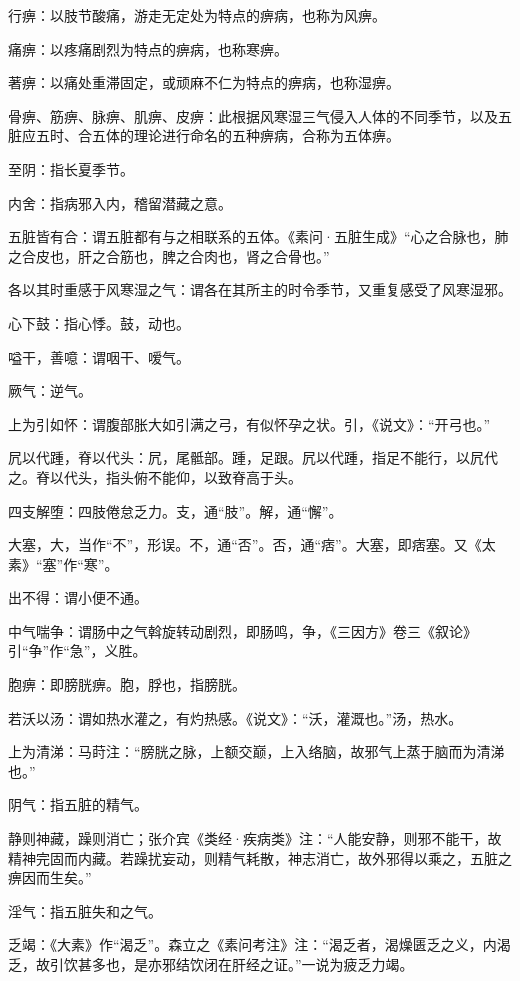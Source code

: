 \documentclass[draft,12pt]{ctexbook}
\begin{document}
\begin{jiaozhu}
	\item 行痹：以肢节酸痛，游走无定处为特点的痹病，也称为风痹。
	\item 痛痹：以疼痛剧烈为特点的痹病，也称寒痹。
	\item 著痹：以痛处重滞固定，或顽麻不仁为特点的痹病，也称湿痹。
	\item 骨痹、筋痹、脉痹、肌痹、皮痹：此根据风寒湿三气侵入人体的不同季节，以及五脏应五时、合五体的理论进行命名的五种痹病，合称为五体痹。
	\item 至阴：指长夏季节。
	\item 内舍：指病邪入内，稽留潜藏之意。
	\item 五脏皆有合：谓五脏都有与之相联系的五体。《素问·五脏生成》“心之合脉也，肺之合皮也，肝之合筋也，脾之合肉也，肾之合骨也。”
	\item 各以其时重感于风寒湿之气：谓各在其所主的时令季节，又重复感受了风寒湿邪。
	\item 心下鼓：指心悸。鼓，动也。
	\item 嗌干，善噫：谓咽干、嗳气。
	\item 厥气：逆气。
	\item 上为引如怀：谓腹部胀大如引满之弓，有似怀孕之状。引，《说文》：“开弓也。”
	\item 凥以代踵，脊以代头：凥，尾骶部。踵，足跟。凥以代踵，指足不能行，以凥代之。脊以代头，指头俯不能仰，以致脊高于头。
	\item 四支解堕：四肢倦怠乏力。支，通“肢”。解，通“懈”。
	\item 大塞，大，当作“不”，形误。不，通“否”。否，通“痞”。大塞，即痞塞。又《太素》“塞”作“寒”。
	\item 出不得：谓小便不通。
	\item 中气喘争：谓肠中之气斡旋转动剧烈，即肠鸣，争，《三因方》卷三《叙论》引“争”作“急”，义胜。
	\item 胞痹：即膀胱痹。胞，脬也，指膀胱。
	\item 若沃以汤：谓如热水灌之，有灼热感。《说文》：“沃，灌溉也。”汤，热水。
	\item 上为清涕：马莳注：“膀胱之脉，上额交巅，上入络脑，故邪气上蒸于脑而为清涕也。”
	\item 阴气：指五脏的精气。
	\item 静则神藏，躁则消亡；张介宾《类经·疾病类》注：“人能安静，则邪不能干，故精神完固而内藏。若躁扰妄动，则精气耗散，神志消亡，故外邪得以乘之，五脏之痹因而生矣。”
	\item 淫气：指五脏失和之气。
	\item 乏竭：《大素》作“渴乏”。森立之《素问考注》注：“渴乏者，渴燥匮乏之义，内渴乏，故引饮甚多也，是亦邪结饮闭在肝经之证。”一说为疲乏力竭。

\end{jiaozhu}
\end{document}
